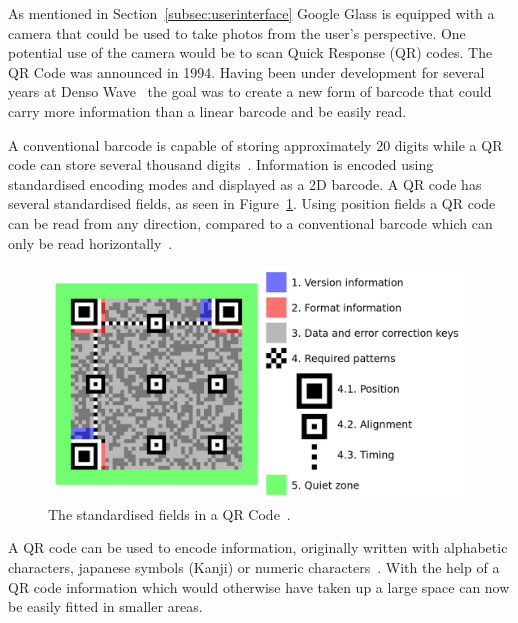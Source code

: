 As mentioned in Section~\ref{subsec:userinterface} Google Glass is equipped with a camera that could be used to take photos from the user's perspective. One potential use of the camera would be to scan Quick Response (QR) codes. The QR Code was announced in 1994. Having been under development for several years at Denso Wave~\cite{qrCodeHistory} the goal was to create a new form of barcode that could carry more information than a linear barcode and be easily read.

A conventional barcode is capable of storing approximately 20 digits while a QR code can store several thousand digits~\cite{qrCodeType}. Information is encoded using standardised encoding modes and displayed as a 2D barcode. A QR code has several standardised fields, as seen in Figure~\ref{qrcodestandard}. Using position fields a QR code can be read from any direction, compared to a conventional barcode which can only be read horizontally~\cite{qrCodeAbout}.

	\begin{figure}[H]%
		\centering
		\includegraphics[width=110mm]{images/qrcodestandard}
		\caption{The standardised fields in a QR Code~\cite{qrCodeWiki}.}
		\label{qrcodestandard}
	\end{figure}
	 
A QR code can be used to encode information, originally written with alphabetic characters, japanese symbols (Kanji) or numeric characters~\cite{qrCodeVersion}. With the help of a QR code information which would otherwise have taken up a large space can now be easily fitted in smaller areas.
